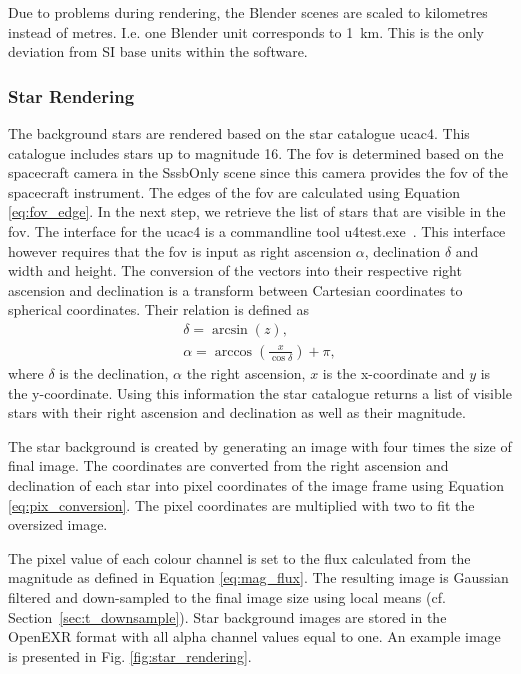 Due to problems during rendering, the Blender scenes are scaled to kilometres instead of metres. I.e. one Blender unit corresponds to \SI{1}{\kilo\meter}. This is the only deviation from SI base units within the software.

\subsubsection{Star Rendering} \label{sec:stars}
The background stars are rendered based on the star catalogue \gls{ucac4}. This catalogue includes stars up to magnitude 16. The \gls{fov} is determined based on the spacecraft camera in the SssbOnly scene since this camera provides the \gls{fov} of the spacecraft instrument. The edges of the \gls{fov} are calculated using Equation \ref{eq:fov_edge}. 
In the next step, we retrieve the list of stars that are visible in the \gls{fov}. The interface for the \gls{ucac4} is a commandline tool u4test.exe~\cite{gray}. This interface however requires that the \gls{fov} is input as right ascension $\alpha$, declination $\delta$ and width and height.
The conversion of the vectors into their respective right ascension and declination is a transform between Cartesian coordinates to spherical coordinates. Their relation is defined as
\begin{align}
    \delta = \arcsin{(z)}, \label{eq:declination} \\
    \alpha = \arccos{\left(\frac{x}{\cos{\delta}}\right)} + \pi, \label{eq:right_ascension}
\end{align}
where $\delta$ is the declination, $\alpha$ the right ascension, $x$ is the x-coordinate and $y$ is the y-coordinate. Using this information the star catalogue returns a list of visible stars with their right ascension and declination as well as their magnitude.

The star background is created by generating an image with four times the size of final image. The coordinates are converted from the right ascension and declination of each star into pixel coordinates of the image frame using Equation \ref{eq:pix_conversion}. The pixel coordinates are multiplied with two to fit the oversized image.

The pixel value of each colour channel is set to the flux calculated from the magnitude as defined in Equation \ref{eq:mag_flux}. The resulting image is Gaussian filtered and down-sampled to the final image size using local means (cf. Section~\ref{sec:t_downsample}). Star background images are stored in the OpenEXR format with all alpha channel values equal to one. An example image is presented in Fig. \ref{fig:star_rendering}.

